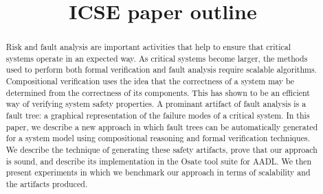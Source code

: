 \documentclass[10pt,conference]{IEEEtran}
\begin{document}
\newcommand{\stateequiv}{\equiv_{s}}
\newcommand{\traceequiv}{\equiv_{\sigma}}
\newcommand{\ta}{\text{TA}}
\newcommand{\cta}{\text{TA$_{C}$}}
\newcommand{\tta}{\text{TA$_{T}$}}
\newcommand{\ucalg}{\texttt{\small{IVC\_UC}}}
\newcommand{\ucbfalg}{\texttt{\small{IVC\_UCBF}}}


\title{ICSE paper outline}
%


\author{
\and
{}
\and
{}
\and
{}
}

\maketitle

\begin{abstract}
Risk and fault analysis are important activities that help to ensure that critical systems operate in an expected way. As critical systems become larger, the methods used to perform both formal verification and fault analysis require scalable algorithms. Compositional verification uses the idea that the correctness of a system may be determined from the correctness of its components. This has shown to be an efficient way of verifying system safety properties. A prominant artifact of fault analysis is a fault tree: a graphical representation of the failure modes of a critical system. In this paper, we describe a new approach in which fault trees can be automatically generated for a system model using compositional reasoning and formal verification techniques. We describe the technique of generating these safety artifacts, prove that our approach is sound, and describe its implementation in the Osate tool suite for AADL. We then present experiments in which we benchmark our approach in terms of scalability and the artifacts produced. 
\end{abstract}
\end{document}
